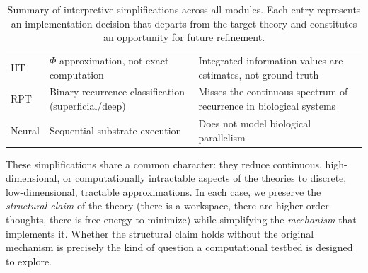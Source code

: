 \begin{table}[t]
\begin{tabular}{p{1.2cm}p{4.8cm}p{5.5cm}}
IIT & $\Phi$ approximation, not exact computation & Integrated information values are estimates, not ground truth \\
RPT & Binary recurrence classification (superficial/deep) & Misses the continuous spectrum of recurrence in biological systems \\
Neural & Sequential substrate execution & Does not model biological parallelism \\
\bottomrule
\end{tabular}
\caption{Summary of interpretive simplifications across all modules. Each entry represents an implementation decision that departs from the target theory and constitutes an opportunity for future refinement.}
\label{tab:simplifications}
\end{table}

These simplifications share a common character: they reduce continuous, high-dimensional, or computationally intractable aspects of the theories to discrete, low-dimensional, tractable approximations. In each case, we preserve the \textit{structural claim} of the theory (there is a workspace, there are higher-order thoughts, there is free energy to minimize) while simplifying the \textit{mechanism} that implements it. Whether the structural claim holds without the original mechanism is precisely the kind of question a computational testbed is designed to explore.

